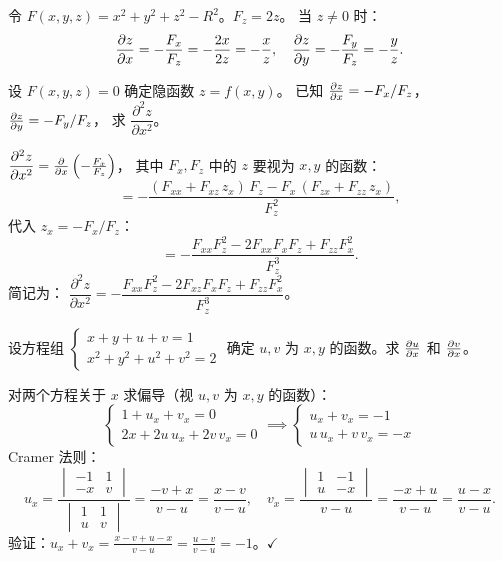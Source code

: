 \documentclass{ctexart}
\begin{document}
\begin{solution}
  令 $F(x,y,z) = x^2+y^2+z^2 - R^2$。$F_z = 2z$。
  当 $z \ne 0$ 时：
  \[
    \frac{\partial z}{\partial x} = -\frac{F_x}{F_z} = -\frac{2x}{2z} = -\frac{x}{z}, \quad
    \frac{\partial z}{\partial y} = -\frac{F_y}{F_z} = -\frac{y}{z}.
  \]
\end{solution}

\begin{exercise}[隐函数求导——进阶]
  设 $F(x,y,z) = 0$ 确定隐函数 $z = f(x,y)$。
  已知 $\frac{\partial z}{\partial x} = -F_x/F_z$，$\frac{\partial z}{\partial y} = -F_y/F_z$，
  求 $\dfrac{\partial^2 z}{\partial x^2}$。
\end{exercise}

\begin{solution}
  $\dfrac{\partial^2 z}{\partial x^2} = \frac{\partial }{\partial x}\left(-\frac{F_x}{F_z}\right)$，
  其中 $F_x, F_z$ 中的 $z$ 要视为 $x,y$ 的函数：
  \[
    = -\frac{(F_{xx} + F_{xz}\,z_x)\,F_z - F_x\,(F_{zx} + F_{zz}\,z_x)}{F_z^2},
  \]
  代入 $z_x = -F_x/F_z$：
  \[
    = -\frac{F_{xx}F_z^2 - 2F_{xx}F_xF_z + F_{zz}F_x^2}{F_z^3}.
  \]
  简记为：
  $\dfrac{\partial^2 z}{\partial x^2} = -\dfrac{F_{xx}F_z^2 - 2F_{xz}F_xF_z + F_{zz}F_x^2}{F_z^3}$。
\end{solution}

\begin{exercise}[隐函数组求导]
  设方程组
  $\begin{cases} x + y + u + v = 1 \\ x^2 + y^2 + u^2 + v^2 = 2 \end{cases}$
  确定 $u, v$ 为 $x, y$ 的函数。求 $\frac{\partial u}{\partial x}$ 和 $\frac{\partial v}{\partial x}$。
\end{exercise}

\begin{solution}
  对两个方程关于 $x$ 求偏导（视 $u, v$ 为 $x,y$ 的函数）：
  \[
    \begin{cases}
      1 + u_x + v_x = 0 \\
      2x + 2u\, u_x + 2v\, v_x = 0
    \end{cases}
    \implies
    \begin{cases}
      u_x + v_x = -1 \\
      u\, u_x + v\, v_x = -x
    \end{cases}
  \]
  Cramer 法则：
  \[
    u_x = \frac{\begin{vmatrix} -1 & 1 \\ -x & v \end{vmatrix}}{\begin{vmatrix} 1 & 1 \\ u & v \end{vmatrix}}
    = \frac{-v+x}{v-u} = \frac{x-v}{v-u},
    \quad
    v_x = \frac{\begin{vmatrix} 1 & -1 \\ u & -x \end{vmatrix}}{v-u}
    = \frac{-x+u}{v-u} = \frac{u-x}{v-u}.
  \]
  验证：$u_x + v_x = \frac{x-v+u-x}{v-u} = \frac{u-v}{v-u} = -1$。$\checkmark$
\end{solution}
\end{document}
